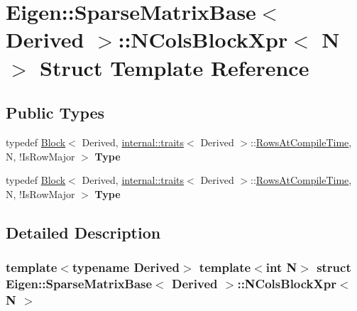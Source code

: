 \hypertarget{struct_eigen_1_1_sparse_matrix_base_1_1_n_cols_block_xpr}{}\section{Eigen\+:\+:Sparse\+Matrix\+Base$<$ Derived $>$\+:\+:N\+Cols\+Block\+Xpr$<$ N $>$ Struct Template Reference}
\label{struct_eigen_1_1_sparse_matrix_base_1_1_n_cols_block_xpr}
\subsection*{Public Types}
\begin{DoxyCompactItemize}
\item 
\mbox{\label{struct_eigen_1_1_sparse_matrix_base_1_1_n_cols_block_xpr_a5496bae9fad4c9667e632a64337c0e89}} 
typedef \hyperlink{group___core___module_class_eigen_1_1_block}{Block}$<$ Derived, \hyperlink{struct_eigen_1_1internal_1_1traits}{internal\+::traits}$<$ Derived $>$\+::\hyperlink{group___sparse_core___module_a726a12d2ba40a5f476c247c8f6db39d9a2f653eb5b8f73f2fafcdd090987c088d}{Rows\+At\+Compile\+Time}, N, !Is\+Row\+Major $>$ {\bfseries Type}
\item 
\mbox{\label{struct_eigen_1_1_sparse_matrix_base_1_1_n_cols_block_xpr_a5496bae9fad4c9667e632a64337c0e89}} 
typedef \hyperlink{group___core___module_class_eigen_1_1_block}{Block}$<$ Derived, \hyperlink{struct_eigen_1_1internal_1_1traits}{internal\+::traits}$<$ Derived $>$\+::\hyperlink{group___sparse_core___module_a726a12d2ba40a5f476c247c8f6db39d9a2f653eb5b8f73f2fafcdd090987c088d}{Rows\+At\+Compile\+Time}, N, !Is\+Row\+Major $>$ {\bfseries Type}
\end{DoxyCompactItemize}


\subsection{Detailed Description}
\subsubsection*{template$<$typename Derived$>$\newline
template$<$int N$>$\newline
struct Eigen\+::\+Sparse\+Matrix\+Base$<$ Derived $>$\+::\+N\+Cols\+Block\+Xpr$<$ N $>$}




